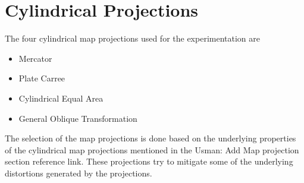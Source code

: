 
\section{Cylindrical Projections}

The four cylindrical map projections used for the experimentation are
\begin{itemize}
    \item Mercator
    \item Plate Carree
    \item Cylindrical Equal Area
    \item General Oblique Transformation
\end{itemize}
The selection of the map projections is done based on the underlying properties of the cylindrical map projections mentioned in the {Usman: Add Map projection section reference link}. These projections try to mitigate some of the underlying distortions generated by the projections.


